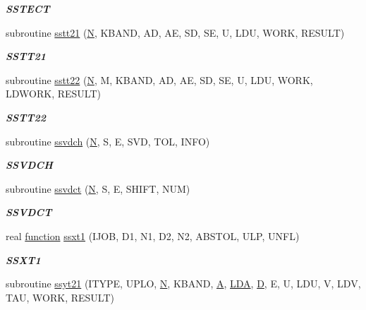 \begin{DoxyCompactItemize}
\begin{DoxyCompactList}\small\item\em {\bfseries S\+S\+T\+E\+C\+T} \end{DoxyCompactList}\item 
subroutine \hyperlink{group__single__eig_ga7e0e860e3759067b5e3ace2787d8415d}{sstt21} (\hyperlink{polmisc_8c_a0240ac851181b84ac374872dc5434ee4}{N}, K\+B\+A\+N\+D, A\+D, A\+E, S\+D, S\+E, U, L\+D\+U, W\+O\+R\+K, R\+E\+S\+U\+L\+T)
\begin{DoxyCompactList}\small\item\em {\bfseries S\+S\+T\+T21} \end{DoxyCompactList}\item 
subroutine \hyperlink{group__single__eig_ga939255a845788e786a4a5b786f878a22}{sstt22} (\hyperlink{polmisc_8c_a0240ac851181b84ac374872dc5434ee4}{N}, M, K\+B\+A\+N\+D, A\+D, A\+E, S\+D, S\+E, U, L\+D\+U, W\+O\+R\+K, L\+D\+W\+O\+R\+K, R\+E\+S\+U\+L\+T)
\begin{DoxyCompactList}\small\item\em {\bfseries S\+S\+T\+T22} \end{DoxyCompactList}\item 
subroutine \hyperlink{group__single__eig_ga27173aa839453594dfc1a893dff10f60}{ssvdch} (\hyperlink{polmisc_8c_a0240ac851181b84ac374872dc5434ee4}{N}, S, E, S\+V\+D, T\+O\+L, I\+N\+F\+O)
\begin{DoxyCompactList}\small\item\em {\bfseries S\+S\+V\+D\+C\+H} \end{DoxyCompactList}\item 
subroutine \hyperlink{group__single__eig_ga1f89a00fd5baa9f3d801169211b98930}{ssvdct} (\hyperlink{polmisc_8c_a0240ac851181b84ac374872dc5434ee4}{N}, S, E, S\+H\+I\+F\+T, N\+U\+M)
\begin{DoxyCompactList}\small\item\em {\bfseries S\+S\+V\+D\+C\+T} \end{DoxyCompactList}\item 
real \hyperlink{afunc_8m_a7b5e596df91eadea6c537c0825e894a7}{function} \hyperlink{group__single__eig_ga8f56dead1fe2a44da7b5e261280a441e}{ssxt1} (I\+J\+O\+B, D1, N1, D2, N2, A\+B\+S\+T\+O\+L, U\+L\+P, U\+N\+F\+L)
\begin{DoxyCompactList}\small\item\em {\bfseries S\+S\+X\+T1} \end{DoxyCompactList}\item 
subroutine \hyperlink{group__single__eig_gacd0abbe15d93a0180c975f8b2af5f801}{ssyt21} (I\+T\+Y\+P\+E, U\+P\+L\+O, \hyperlink{polmisc_8c_a0240ac851181b84ac374872dc5434ee4}{N}, K\+B\+A\+N\+D, \hyperlink{classA}{A}, \hyperlink{example__user_8c_ae946da542ce0db94dced19b2ecefd1aa}{L\+D\+A}, \hyperlink{odrpack_8h_a7dae6ea403d00f3687f24a874e67d139}{D}, E, U, L\+D\+U, V, L\+D\+V, T\+A\+U, W\+O\+R\+K, R\+E\+S\+U\+L\+T)

\end{DoxyCompactItemize}

